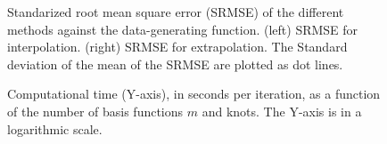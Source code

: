\documentclass[]{interact}
\theoremstyle{plain}%
\theoremstyle{definition}
\theoremstyle{remark}
\begin{document}
\begin{figure}
\caption{Standarized root mean square error (SRMSE) of the different methods against the data-generating function. (left) SRMSE for interpolation. (right) SRMSE for extrapolation. The Standard deviation of the mean of the SRMSE are plotted as dot lines.}
  \label{fig11_MSE_exI_inter}
\end{figure}

\begin{figure}
\centering
{}
\caption{Computational time (Y-axis), in seconds per iteration, as a function of the number of basis functions $m$ and knots. The Y-axis is in a logarithmic scale.}
  \label{fig11_time_exI}
\end{figure}
\end{document}
